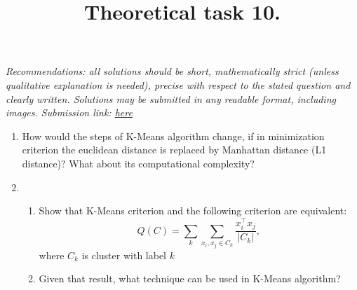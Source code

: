 \documentclass{article}
\title{Theoretical task 10.}
\date{}
\begin{document}
\maketitle
{\it Recommendations: all solutions should be short, mathematically strict (unless qualitative explanation is needed), precise with respect to the stated question and clearly written. Solutions may be submitted in any readable format, including images. \newline
Submission link: \href{https://www.dropbox.com/request/aCKnPmaT1swqbJzLBfye}{here} }

\begin{enumerate}
	\item How would the steps of K-Means algorithm change, if in minimization criterion the euclidean distance is replaced by Manhattan distance (L1 distance)? What about its computational complexity?
	\item 
	\begin{enumerate}
		\item 	Show that K-Means criterion and the following criterion are equivalent:
	\[
	Q(C) = \sum_{k} \sum_{x_i, x_j \in C_k} \frac{ x_i^\top x_j}{|C_k|},
	\]
	where $C_k$ is cluster with label $k$
		\item Given that result, what technique can be used in K-Means algorithm?
	\end{enumerate}

\end{enumerate}
\end{document}

